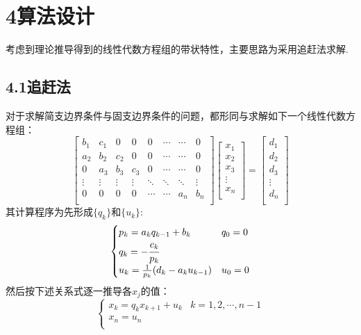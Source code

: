 \documentclass[12pt]{article}
\begin{document}
\section*{{\large\bf 4}\quad\large\heiti  算法设计}
\par 考虑到理论推导得到的线性代数方程组的带状特性，主要思路为采用追赶法求解.
\subsection*{{\normalsize 4.1}\quad\normalsize\heiti 追赶法}
\par 对于求解简支边界条件与固支边界条件的问题，都形同与求解如下一个线性代数方程组：
$$
\left[ \begin{matrix}
 b_{1} & c_{1} & 0 & 0 & 0 & \cdots & \cdots& 0\\
 a_{2} & b_{2} & c_{2} & 0 & 0 & \cdots & \cdots & 0\\
 0 & a_{3} & b_{3} &c_{3} & 0 & \cdots & \cdots & 0\\
 \vdots & \vdots & \vdots & \vdots & \ddots & \ddots & \ddots & \vdots\\  
 0 & 0 & 0 & 0 & \cdots & \cdots & a_{n} & b_{n}\\
 \end{matrix} \right]
 \left[ \begin{matrix} 
 x_{1}\\
 x_{2}\\
 x_{3}\\
 \vdots\\
 x_{n}\\
 \end{matrix} \right]
 =
 \left[ \begin{matrix}
 d_{1}\\
 d_{2}\\
 d_{3}\\
 \vdots\\
 d_{n}\\
 \end{matrix} \right]
$$	
其计算程序为先形成$\{q_{k}\}$和$\{u_{k}\}$:
\begin{equation}\label{11}
\begin{cases}
	p_{k}=a_{k}q_{k-1}+b_{k} & q_{0} = 0\\
	q_{k}=-\cfrac{c_{k}}{p_{k}} &\\
	u_{k}=\frac{1}{p_{k}}(d_{k}-a_{k}u_{k-1}) & u_{0}=0\\
\end{cases}
\end{equation}
然后按下述关系式逐一推导各$x_{j}$的值：
\begin{equation}\label{12}
\begin{cases}
	x_{k}=q_{k}x_{k+1}+u_{k} & k=1,2,\cdots,n-1\\
	x_{n}=u_{n}\\
\end{cases}
\end{equation}
\end{document}
